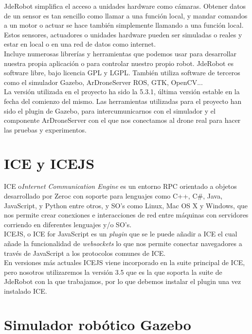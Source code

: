 JdeRobot simplifica el acceso a unidades hardware como cámaras. Obtener datos de un sensor es tan sencillo como llamar a una función local, y mandar comandos a un motor o actuar se hace también simplemente llamando a una función local. Estos sensores, actuadores o unidades hardware pueden ser simuladas o reales y estar en local o en una red de datos como internet.\\

Incluye numerosas librerías y herramientas que podemos usar para desarrollar nuestra propia aplicación o para controlar nuestro propio robot. JdeRobot es software libre, bajo licencia GPL y LGPL. También utiliza software de terceros como el simulador Gazebo, ArDroneServer ROS, GTK, OpenCV...\\

La versión utilizada en el proyecto ha sido la 5.3.1, última versión estable en la fecha del comienzo del mismo. Las herramientas utilizadas para el proyecto han sido el plugin de Gazebo, para intercumunicarnos con el simulador y el componente ArDroneServer con el que nos conectamos al drone real para hacer las pruebas y experimentos.\\

\section{ICE y ICEJS}

ICE o\emph{Internet Communication Engine} es un entorno RPC orientado a objetos desarrollado por Zeroc con soporte para lenguajes como C++, C\#, Java, JavaScript, y Python entre otros, y SO's como Linux, Mac OS X y Windows, que nos permite crear conexiones e interacciones de red entre máquinas con servidores corriendo en diferentes lenguajes y/o SO's.\\

ICEJS, o ICE for JavaScript es un \textit{plugin} que se le puede añadir a ICE el cual añade la funcionalidad de \textit{websockets} lo que nos permite conectar navegadores a través de JavaScript a los protocolos comunes de ICE. \\

En versiones más actuales ICEJS viene incorporado en la suite principal de ICE, pero nosotros utilizaremos la versión 3.5 que es la que soporta la suite de JdeRobot con la que trabajamos, por lo que debemos instalar el plugin una vez instalado ICE.\\

\section{Simulador robótico Gazebo}

